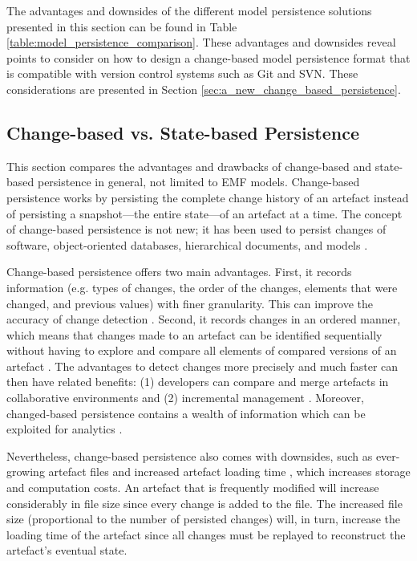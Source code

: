 The advantages and downsides of the different model persistence solutions presented in this section can be found in Table \ref{table:model_persistence_comparison}. These advantages and downsides reveal points to consider on how to design a change-based model persistence format that is compatible with version control systems such as Git and SVN. These considerations are presented in Section \ref{sec:a_new_change_based_persistence}.

\subsection{Change-based vs. State-based Persistence}
\label{sec:change_based_vs_state_based_persistence}
This section compares the advantages and drawbacks of change-based and state-based persistence in general, not limited to EMF models. Change-based persistence works by persisting the complete change history of an artefact instead of persisting a snapshot—the entire state—of an artefact at a time. The concept of change-based persistence is not new; it has been used to persist changes of software, object-oriented databases, hierarchical documents, and models \cite{DBLP:journals/entcs/RobbesL07,DBLP:conf/sde/LippeO92,DBLP:conf/caise/IgnatN05,koegel2010emfstore}.

Change-based persistence offers two main advantages. First, it records information (e.g. types of changes, the order of the changes, elements that were changed, and previous values) with finer granularity. This can improve the accuracy of change detection \cite{DBLP:journals/entcs/RobbesL07,DBLP:conf/sde/LippeO92,DBLP:conf/caise/IgnatN05,mens2002state}. Second, it records changes in an ordered manner, which means that changes made to an artefact can be identified sequentially without having to explore and compare all elements of compared versions of an artefact \cite{DBLP:conf/edoc/KoegelHLHD10}. The advantages to detect changes more precisely and much faster can then have related benefits: (1) developers can compare and merge artefacts in collaborative environments \cite{DBLP:conf/sde/LippeO92,DBLP:conf/caise/IgnatN05,koegel2010emfstore} and (2) incremental management \cite{jouault2010towards,DBLP:conf/ecmdafa/OgunyomiRK15, DBLP:conf/ecmdafa/RathHV12}. Moreover, changed-based persistence contains a wealth of information which can be exploited for analytics \cite{DBLP:journals/entcs/RobbesL07}.

Nevertheless, change-based persistence also comes with downsides, such as ever-growing artefact files \cite{DBLP:journals/entcs/RobbesL07,DBLP:conf/edoc/KoegelHLHD10} and increased artefact loading time \cite{mens2002state}, which increases storage and computation costs. An artefact that is frequently modified will increase considerably in file size since every change is added to the file. The increased file size (proportional to the number of persisted changes) will, in turn, increase the loading time of the artefact since all changes must be replayed to reconstruct the artefact’s eventual state.

